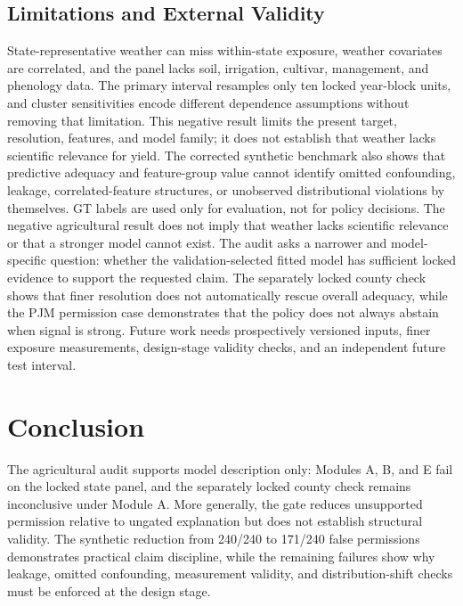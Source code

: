 \documentclass[conference]{IEEEtran}
\begin{document}
\subsection{Limitations and External Validity}
State-representative weather can miss within-state exposure, weather covariates
are correlated, and the panel lacks soil, irrigation, cultivar, management, and
phenology data. The primary interval resamples only ten locked year-block units, and
cluster sensitivities encode different dependence assumptions without removing
that limitation. This negative result limits the present target, resolution,
features, and model family; it does not establish that weather lacks scientific
relevance for yield. The corrected synthetic benchmark also shows that predictive
adequacy and feature-group value cannot identify omitted confounding, leakage,
correlated-feature structures, or unobserved distributional violations by
themselves. GT labels are used only for evaluation, not for policy decisions.
The negative agricultural result does not imply that weather lacks scientific
relevance or that a stronger model cannot exist. The audit asks a narrower and
model-specific question: whether the validation-selected fitted model has
sufficient locked evidence to support the requested claim. The separately locked
county check shows that finer resolution does not automatically rescue overall
adequacy, while the PJM permission case demonstrates that the policy does not
always abstain when signal is strong.
Future work needs prospectively versioned inputs, finer exposure measurements,
design-stage validity checks, and an independent future test interval.

\section{Conclusion}
The agricultural audit supports model description only: Modules A, B, and E fail
on the locked state panel, and the separately locked county check remains
inconclusive under Module A. More generally, the gate reduces unsupported
permission relative to ungated explanation but does not establish structural
validity. The synthetic reduction from 240/240 to 171/240 false permissions
demonstrates practical claim discipline, while the remaining failures show why
leakage, omitted confounding, measurement validity, and distribution-shift checks
must be enforced at the design stage.



\end{document}
